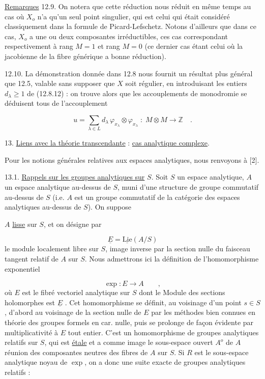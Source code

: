 \underline{Remarques} 12.9. On notera que cette réduction nous réduit en même temps au cas où $X_{o}$ n'a qu'un seul point singulier, qui est celui qui était considéré classiquement dans la formule de Picard-Lefschetz. Notons d'ailleurs que dans ce cas, $X_{o}$ a une ou deux composantes irréductibles, ces cas correspondant respectivement à rang $M = 1$ et rang $M = 0$ (ce dernier cas étant celui où la jacobienne de la fibre générique a bonne réduction).

12.10.  La démonstration donnée dans 12.8 nous fournit un résultat plus général que 12.5, valable sans supposer que $X$ soit régulier, en introduisant les entiers $d_{\lambda} \geqslant 1$ de (12.8.12) : on trouve alors que les accouplements de monodromie se déduisent tous de l'accouplement

\begin{equation}\tag{12.10.1}
u = \sum_{\lambda \in L} d_{\lambda} \, \varphi_{x_{\lambda}} \otimes \varphi_{x_{\lambda}} \; : \; M \otimes M \longrightarrow \mathbb{Z} \quad .
\end{equation}

13.  \underline{Liens avec la théorie transcendante} : \underline{cas analytique complexe}.

Pour les notions générales relatives aux espaces analytiques, nous renvoyons à [2].

13.1.  \underline{Rappels sur les groupes analytiques sur} $S$.  Soit $S$ un espace analytique, $A$ un espace analytique au-dessus de $S$, muni d'une structure de groupe commutatif au-dessus de $S$ (i.e. $A$ est un groupe commutatif de la catégorie des espaces analytiques au-dessus de $S$). On suppose



$A$ \underline{lisse} sur $S$, et on désigne par

\begin{equation}\tag{13.1.1}
\underline{E} = \underline{\mathrm{Lie}}(A/S)
\end{equation}
le module localement libre sur $S$, image inverse par la section nulle du faisceau tangent relatif de $A$ sur $S$. Nous admettrons ici la définition de l'homomorphisme exponentiel

\begin{equation}\tag{13.1.2}
\exp: E \longrightarrow A \qquad ,
\end{equation}
où $E$ est le fibré vectoriel analytique sur $S$ dont le Module des sections holomorphes est $\underline{E}$ . Cet homomorphisme se définit, au voisinage d'un point $s \in S$, d'abord au voisinage de la section nulle de $E$ par les méthodes bien connues en théorie des groupes formels en car. nulle, puis se prolonge de façon évidente par multiplicativité à $E$ tout entier. C'est un homomorphisme de groupes analytiques relatifs sur $S$, qui est \underline{étale} et a comme image le sous-espace ouvert $A^{o}$ de $A$ réunion des composantes neutres des fibres de $A$ sur $S$. Si $R$ est le sous-espace analytique noyau de $\exp$, on a donc une suite exacte de groupes analytiques relatifs :

